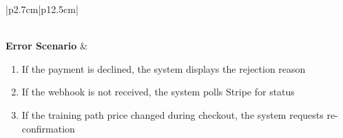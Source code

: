 \begin{table}[H]
\begin{tabular}{|p{2.7cm}|p{12.5cm}|}
\begin{minipage}[t]{\linewidth}
                                       \end{minipage}            \\
            \hline
            \textbf{Error Scenario}  & \begin{minipage}[t]{\linewidth}
                                           \begin{enumerate}[topsep=0pt,itemsep=1pt,parsep=0pt,partopsep=0pt]
                                               \item If the payment is declined, the system displays the rejection reason
                                               \item If the webhook is not received, the system polls Stripe for status
                                               \item If the training path price changed during checkout, the system requests
                                                     re-confirmation
                                           \end{enumerate}
                                       \end{minipage}    \\
            \hline
        \end{tabular}
        \label{tab:eng-checkout}
    \end{table}
